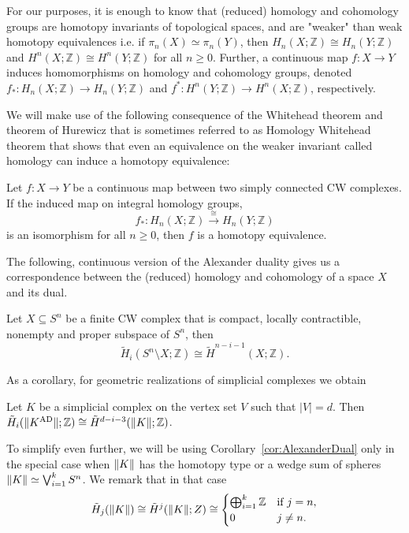 \documentclass[a4paper, v2021]{lipics-v2021}
\theoremstyle{plain}
\theoremstyle{definition}
\newcommand{\AD}{\mathrm{AD}}{}
\DeclarePairedDelimiter{\gr}{\lVert}{\rVert}
\begin{document}
For our purposes, it is enough to know that (reduced) homology and cohomology groups are homotopy invariants of topological spaces, and are "weaker" than weak homotopy equivalences i.e. if $\pi_n(X)\simeq \pi_n(Y)$, then $H_n(X; \mathbb{Z}) \cong H_n(Y; \mathbb{Z})$ and $H^n(X; \mathbb{Z}) \cong H^n(Y; \mathbb{Z})$ for all $n\geq 0$. Further, a continuous map $f\colon X \to Y$ induces homomorphisms on homology and cohomology groups, denoted $f_*\colon H_n(X; \mathbb{Z}) \to H_n(Y; \mathbb{Z})$ and $f^*\colon H^n(Y; \mathbb{Z}) \to H^n(X; \mathbb{Z})$, respectively.

We will make use of the following consequence of the Whitehead theorem and theorem of Hurewicz that is sometimes referred to as Homology Whitehead theorem that shows that even an equivalence on the weaker invariant called homology can induce a homotopy equivalence:
\begin{theorem}\label{t:whitehead}
Let $f: X \to Y$ be a continuous map between two simply connected CW complexes. If the induced map on integral homology groups,
$$f_*: H_n(X; \mathbb{Z}) \xrightarrow{\cong} H_n(Y; \mathbb{Z})$$
is an isomorphism for all $n \ge 0$, then $f$ is a homotopy equivalence.
\end{theorem}

The following, continuous version of the Alexander duality gives us a correspondence between the (reduced) homology and cohomology of a space $X$ and its dual. 
\begin{theorem}\label{thm:duality}
Let $X\subseteq S^n$ be a finite CW complex that is compact, locally contractible, nonempty and proper subspace of $S^n$, then 
\[
\tilde{H}_i(S^n \setminus X;\mathbb{Z}) \cong \tilde{H}^{n-i-1}(X;\mathbb{Z}).
\]
\end{theorem}
As a corollary, for geometric realizations of simplicial complexes we obtain 
\begin{corollary}\label{cor:AlexanderDual}
    Let $K$ be a simplicial complex on the vertex set $V$ such that $|V| = d$. Then  $\tilde{H}_i(\gr{K^\AD};\mathbb{Z}) \cong \tilde{H}^{d-i-3}(\gr{K};\mathbb{Z})$.
\end{corollary}

To simplify even further, we will be using Corollary~\ref{cor:AlexanderDual} only in the special case when $\gr{K} $ has the homotopy type or a wedge sum of spheres $\gr{K} \simeq \bigvee_{i = 1}^{k} S^n$. We remark that in that case 
\[
\tilde{H}_j(\gr{K})  \cong \tilde{H}^{j}(\gr{K};Z) \cong 
\begin{cases}
    \bigoplus_{i=1}^{k} \mathbb{Z} & \text{if } j = n, \\
    0 & j\neq n.
\end{cases}
\]
\end{document}
